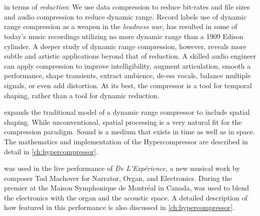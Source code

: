 \section{\thesis}
\label{sec:hypercompression-intro}
 in terms of
\emph{reduction}: We use data compression to reduce bit-rates and file
sizes and audio compression to reduce dynamic range. Record labels use
of dynamic range compression as a weapon in the \emph{loudness
  war}\cite{Deruty2014a}, has resulted in some of today's music
recordings utilizing no more dynamic range than a 1909 Edison
cylinder.\cite{Katz2007} A deeper study of dynamic range compression,
however, reveals more subtle and artistic applications beyond that of
reduction. A skilled audio engineer can apply compression to
improve intelligibility, augment articulation, smooth a performance,
shape transients, extract ambience, de-ess vocals, balance multiple
signals, or even add distortion.\cite{Case2007} At its best, the
compressor is a tool for temporal shaping, rather than a tool for
dynamic reduction.

\thesis expands the traditional model of a dynamic range compressor to
include spatial shaping. While unconventional, spatial processing is a
very natural fit for the compression paradigm. Sound is a medium that
exists in time as well as in space. The mathematics
and implementation of the Hypercompressor are described in detail in
\autoref{ch:hypercompressor}.

\thesis was used in the live performance of \textit{De
  L'Exp\'{e}rience}, a new musical work by composer Tod Machover for
Narrator, Organ, and Electronics. During the premier at the Maison
Symphonique de Montr\'{e}al in Canada, \thesis was used to blend the
electronics with the organ and the acoustic space. 
A detailed description of how \thesis featured in this performance is
also discussed in \autoref{ch:hypercompressor}.


